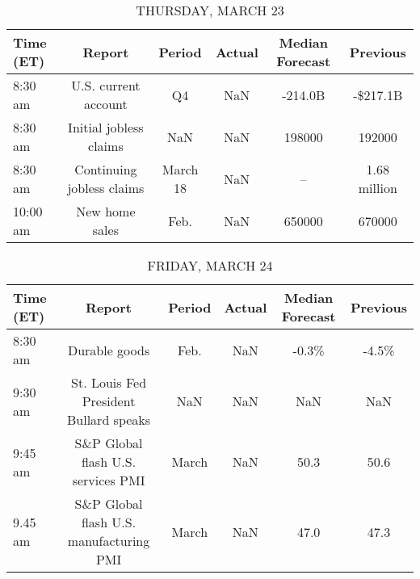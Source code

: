 \documentclass{article}%
\begin{document}
\begin{table}[htbp]%
\caption{THURSDAY, MARCH 23}%
\centering%
\begin{adjustbox}{width=1\textwidth}%
\begin{tabular}{lccccc}
\toprule
Time (ET) &                    Report &   Period & Actual & Median Forecast &     Previous \\
\midrule
  8:30 am &      U.S. current account &       Q4 &    NaN &         -214.0B &     -\$217.1B \\
  8:30 am &    Initial jobless claims &      NaN &    NaN &          198000 &       192000 \\
  8:30 am & Continuing jobless claims & March 18 &    NaN &              -- & 1.68 million \\
 10:00 am &            New home sales &     Feb. &    NaN &          650000 &       670000 \\
\bottomrule
\end{tabular}
%
\end{adjustbox}%
\end{table}

%


\begin{table}[htbp]%
\caption{FRIDAY, MARCH 24}%
\centering%
\begin{adjustbox}{width=1\textwidth}%
\begin{tabular}{lccccc}
\toprule
Time (ET) &                                  Report & Period & Actual & Median Forecast & Previous \\
\midrule
  8:30 am &                           Durable goods &   Feb. &    NaN &           -0.3\% &    -4.5\% \\
  9:30 am &  St. Louis Fed President Bullard speaks &    NaN &    NaN &             NaN &      NaN \\
  9:45 am &      S\&P Global flash U.S. services PMI &  March &    NaN &            50.3 &     50.6 \\
  9.45 am & S\&P Global flash U.S. manufacturing PMI &  March &    NaN &            47.0 &     47.3 \\
\bottomrule
\end{tabular}
%
\end{adjustbox}%
\end{table}
\end{document}
